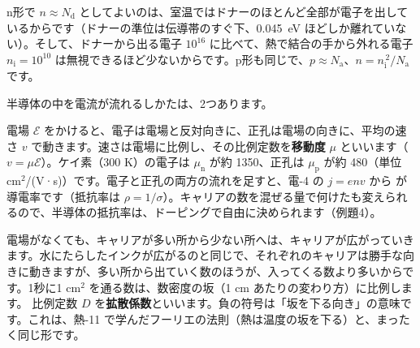 \noindent n形で $n\approx N_{\mathrm d}$ としてよいのは、室温ではドナーのほとんど全部が電子を出しているからです（ドナーの準位は伝導帯のすぐ下、\qty{0.045}{eV} ほどしか離れていない）。そして、ドナーから出る電子 $10^{16}$ に比べて、熱で結合の手から外れる電子 $n_{\mathrm i}=10^{10}$ は無視できるほど少ないからです。p形も同じで、$p\approx N_{\mathrm a}$、$n=n_{\mathrm i}^{\,2}/N_{\mathrm a}$ です。

\label{ph:原-9:sec5}
半導体の中を電流が流れるしかたは、2つあります。

電場 $\mathcal E$ をかけると、電子は電場と反対向きに、正孔は電場の向きに、平均の速さ $v$ で動きます。速さは電場に比例し、その比例定数を\textbf{移動度} $\mu$ といいます（$v=\mu\mathcal E$）。ケイ素（300 K）の電子は $\mu_{\mathrm n}$ が約 1350、正孔は $\mu_{\mathrm p}$ が約 480（単位 cm$^2$/(V·s)）です。電子と正孔の両方の流れを足すと、電-4 の $j=env$ から
\label{ph:原-9:sigma}が導電率です（抵抗率は $\rho=1/\sigma$）。キャリアの数を混ぜる量で何けたも変えられるので、半導体の抵抗率は、ドーピングで自由に決められます（例題4）。

電場がなくても、キャリアが多い所から少ない所へは、キャリアが広がっていきます。水にたらしたインクが広がるのと同じで、それぞれのキャリアは勝手な向きに動きますが、多い所から出ていく数のほうが、入ってくる数より多いからです。1秒に1 cm$^2$ を通る数は、数密度の坂（1 cm あたりの変わり方）に比例します。
\label{ph:原-9:diff}比例定数 $D$ を\textbf{拡散係数}といいます。負の符号は「坂を下る向き」の意味です。これは、熱-11 で学んだフーリエの法則（熱は温度の坂を下る）と、まったく同じ形です。

